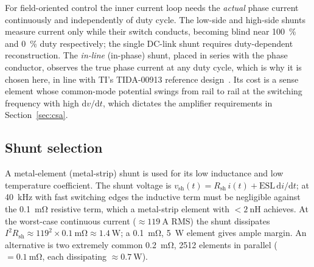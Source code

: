 \documentclass[journal,onecolumn,11pt]{IEEEtran}
\newcommand{\Rshunt}{R_{\mathrm{sh}}}
\begin{document}
For field-oriented control the inner current loop needs the \emph{actual} phase current
continuously and independently of duty cycle. The low-side and high-side shunts measure current
only while their switch conducts, becoming blind near \SI{100}{\percent} and \SI{0}{\percent} duty
respectively; the single DC-link shunt requires duty-dependent reconstruction. The \emph{in-line}
(in-phase) shunt, placed in series with the phase conductor, observes the true phase current at any
duty cycle, which is why it is chosen here, in line with TI's TIDA-00913 reference
design~\cite{tida00913}. Its cost is a sense element whose common-mode potential swings from
rail to rail at the switching frequency with high $\mathrm{d}v/\mathrm{d}t$, which dictates the
amplifier requirements in Section~\ref{sec:csa}.

\subsection{Shunt selection}\label{sec:shunt}
A metal-element (metal-strip) shunt is used for its low inductance and low temperature coefficient.
The shunt voltage is $v_{\mathrm{sh}}(t)=\Rshunt\,i(t)+\mathrm{ESL}\,\mathrm{d}i/\mathrm{d}t$; at
\SI{40}{\kilo\hertz} with fast switching edges the inductive term must be negligible against the
\SI{0.1}{\milli\ohm} resistive term, which a metal-strip element with $<\SI{2}{\nano\henry}$
achieves. At the worst-case continuous current ($\approx\SI{119}{\ampere}$ RMS) the shunt dissipates
$I^2\Rshunt\approx119^2\times\SI{0.1}{\milli\ohm}\approx\SI{1.4}{\watt}$; a \SI{0.1}{\milli\ohm},
\SI{5}{\watt} element gives ample margin. An alternative is two extremely common
\SI{0.2}{\milli\ohm}, 2512 elements in parallel ($=\SI{0.1}{\milli\ohm}$, each dissipating
$\approx\SI{0.7}{\watt}$).
\end{document}
